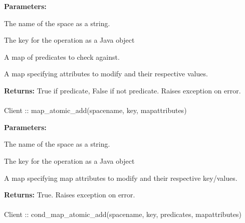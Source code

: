 \noindent\textbf{Parameters:}
\begin{description}[labelindent=\widthof{{\code{predicates}}},leftmargin=*,noitemsep,nolistsep,align=right]
\item[\code{spacename}] The name of the space as a string.
\item[\code{key}] The key for the operation as a Java object
\item[\code{predicates}] A map of predicates to check against.
\item[\code{attributes}] A map specifying attributes to modify and their respective values.
\end{description}

\noindent\textbf{Returns:}
True if predicate, False if not predicate.  Raises exception on error.

\paragraph{}
\label{api:java:map_atomic_add}
\begin{javacode}
Client :: map_atomic_add(spacename, key, mapattributes)
\end{javacode}
\funcdesc 

\noindent\textbf{Parameters:}
\begin{description}[labelindent=\widthof{{\code{mapattributes}}},leftmargin=*,noitemsep,nolistsep,align=right]
\item[\code{spacename}] The name of the space as a string.
\item[\code{key}] The key for the operation as a Java object
\item[\code{mapattributes}] A map specifying map attributes to modify and their respective key/values.
\end{description}

\noindent\textbf{Returns:}
True.  Raises exception on error.

\paragraph{}
\label{api:java:cond_map_atomic_add}
\begin{javacode}
Client :: cond_map_atomic_add(spacename, key, predicates, mapattributes)
\end{javacode}
\funcdesc 

